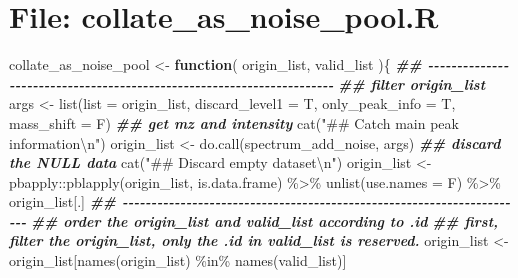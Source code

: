 \documentclass[
]{article}
\newenvironment{Shaded}{\begin{snugshade}}{\end{snugshade}}
\newcommand{\AttributeTok}[1]{\textcolor[rgb]{0.77,0.63,0.00}{#1}}
\newcommand{\ControlFlowTok}[1]{\textcolor[rgb]{0.13,0.29,0.53}{\textbf{#1}}}
\newcommand{\DocumentationTok}[1]{\textcolor[rgb]{0.56,0.35,0.01}{\textbf{\textit{#1}}}}
\newcommand{\FunctionTok}[1]{\textcolor[rgb]{0.00,0.00,0.00}{#1}}
\newcommand{\NormalTok}[1]{#1}
\newcommand{\OtherTok}[1]{\textcolor[rgb]{0.56,0.35,0.01}{#1}}
\newcommand{\SpecialCharTok}[1]{\textcolor[rgb]{0.00,0.00,0.00}{#1}}
\newcommand{\StringTok}[1]{\textcolor[rgb]{0.31,0.60,0.02}{#1}}
\begin{document}
\hypertarget{file-collate_as_noise_pool.r}{%
\section{File: collate\_as\_noise\_pool.R}\label{file-collate_as_noise_pool.r}}

\begin{Shaded}
\begin{Highlighting}[]
\NormalTok{collate\_as\_noise\_pool }\OtherTok{\textless{}{-}} 
  \ControlFlowTok{function}\NormalTok{(}
\NormalTok{    origin\_list,}
\NormalTok{    valid\_list}
\NormalTok{    )\{}
    \DocumentationTok{\#\# {-}{-}{-}{-}{-}{-}{-}{-}{-}{-}{-}{-}{-}{-}{-}{-}{-}{-}{-}{-}{-}{-}{-}{-}{-}{-}{-}{-}{-}{-}{-}{-}{-}{-}{-}{-}{-}{-}{-}{-}{-}{-}{-}{-}{-}{-}{-}{-}{-}{-}{-}{-}{-}{-}{-}{-}{-}{-}{-}{-}{-}{-}{-}{-}{-}{-}{-}{-}{-}{-} }
    \DocumentationTok{\#\# filter origin\_list}
\NormalTok{    args }\OtherTok{\textless{}{-}} \FunctionTok{list}\NormalTok{(}\AttributeTok{list =}\NormalTok{ origin\_list, }\AttributeTok{discard\_level1 =}\NormalTok{ T, }\AttributeTok{only\_peak\_info =}\NormalTok{ T, }\AttributeTok{mass\_shift =}\NormalTok{ F)}
    \DocumentationTok{\#\# get mz and intensity}
    \FunctionTok{cat}\NormalTok{(}\StringTok{"\#\# Catch main peak information}\SpecialCharTok{\textbackslash{}n}\StringTok{"}\NormalTok{)}
\NormalTok{    origin\_list }\OtherTok{\textless{}{-}} \FunctionTok{do.call}\NormalTok{(spectrum\_add\_noise, args)}
    \DocumentationTok{\#\# discard the NULL data}
    \FunctionTok{cat}\NormalTok{(}\StringTok{"\#\# Discard empty dataset}\SpecialCharTok{\textbackslash{}n}\StringTok{"}\NormalTok{)}
\NormalTok{    origin\_list }\OtherTok{\textless{}{-}}\NormalTok{ pbapply}\SpecialCharTok{::}\FunctionTok{pblapply}\NormalTok{(origin\_list, is.data.frame) }\SpecialCharTok{\%\textgreater{}\%} 
      \FunctionTok{unlist}\NormalTok{(}\AttributeTok{use.names =}\NormalTok{ F) }\SpecialCharTok{\%\textgreater{}\%} 
\NormalTok{      origin\_list[.]}
    \DocumentationTok{\#\# {-}{-}{-}{-}{-}{-}{-}{-}{-}{-}{-}{-}{-}{-}{-}{-}{-}{-}{-}{-}{-}{-}{-}{-}{-}{-}{-}{-}{-}{-}{-}{-}{-}{-}{-}{-}{-}{-}{-}{-}{-}{-}{-}{-}{-}{-}{-}{-}{-}{-}{-}{-}{-}{-}{-}{-}{-}{-}{-}{-}{-}{-}{-}{-}{-}{-}{-}{-}{-}{-} }
    \DocumentationTok{\#\# order the origin\_list and valid\_list according to .id}
    \DocumentationTok{\#\# first, filter the origin\_list, only the .id in valid\_list is reserved.}
\NormalTok{    origin\_list }\OtherTok{\textless{}{-}}\NormalTok{ origin\_list[}\FunctionTok{names}\NormalTok{(origin\_list) }\SpecialCharTok{\%in\%} \FunctionTok{names}\NormalTok{(valid\_list)]}

\end{Highlighting}
\end{Shaded}
\end{document}
